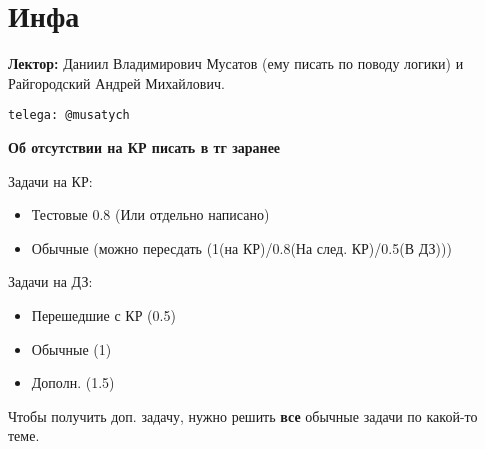 \section{Инфа}
\textbf{Лектор:} Даниил Владимирович Мусатов (ему писать по поводу логики) и Райгородский Андрей Михайлович.
\begin{verbatim}
telega: @musatych
\end{verbatim}
\textbf{Об отсутствии на КР писать в тг заранее}

Задачи на КР:
\begin{itemize}
    \item Тестовые 0.8 (Или отдельно написано)
    \item Обычные (можно пересдать (1(на КР)/0.8(На след. КР)/0.5(В ДЗ)))
\end{itemize}

Задачи на ДЗ:
\begin{itemize}
    \item Перешедшие с КР (0.5)
    \item Обычные (1)
    \item Дополн. (1.5)
\end{itemize}
\begin{note}
Чтобы получить доп. задачу, нужно решить \textbf{все} обычные задачи по какой-то теме.
\end{note}

